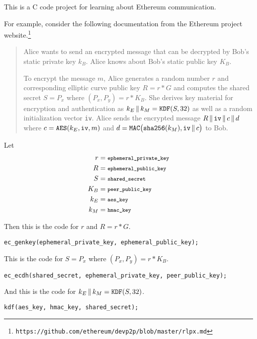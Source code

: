 \documentclass[12pt]{article}
\begin{document}
This is a C code project for learning about Ethereum communication.

\bigskip
For example, consider the following documentation
from the Ethereum project website.\footnote{\tt https://github.com/ethereum/devp2p/blob/master/rlpx.md}

\begin{quote}
Alice wants to send an encrypted message that can be decrypted by Bob's static private key $k_B$.
Alice knows about Bob's static public key $K_B$.

\medskip
To encrypt the message $m$, Alice generates a random number $r$
and corresponding elliptic curve public key $R=r*G$ and computes the
shared secret $S=P_x$ where $(P_x,P_y)=r*K_B$.
She derives key material for encryption and authentication as
$k_E\,\|\,k_M=\text{\tt KDF}(S,32)$
as well as a random initialization vector \verb$iv$.
Alice sends the encrypted message $R\,\|\,\text{\tt iv}\,\|\,c\,\|\,d$
where $c=\text{\tt AES}(k_E,\text{\tt iv},m)$
and $d=\text{\tt MAC}\big(\text{\tt sha256}(k_M),\text{\tt iv}\,\|\,c\big)$ to Bob.
\end{quote}

Let
\begin{align*}
r&=\text{\footnotesize\tt ephemeral\_private\_key}
\\
R&=\text{\footnotesize\tt ephemeral\_public\_key}
\\
S&=\text{\footnotesize\tt shared\_secret}
\\
K_B&=\text{\footnotesize\tt peer\_public\_key}
\\
k_E&=\text{\footnotesize\tt aes\_key}
\\
k_M&=\text{\footnotesize\tt hmac\_key}
\end{align*}

Then this is the code for $r$ and $R=r*G$.
{\footnotesize
\begin{verbatim}
ec_genkey(ephemeral_private_key, ephemeral_public_key);
\end{verbatim}
}

\bigskip
This is the code for $S=P_x$ where $(P_x,P_y)=r*K_B$.
{\footnotesize
\begin{verbatim}
ec_ecdh(shared_secret, ephemeral_private_key, peer_public_key);
\end{verbatim}
}

\bigskip
And this is the code for $k_E\,\|\,k_M=\text{\tt KDF}(S,32)$.
{\footnotesize
\begin{verbatim}
kdf(aes_key, hmac_key, shared_secret);
\end{verbatim}
}
\end{document}
